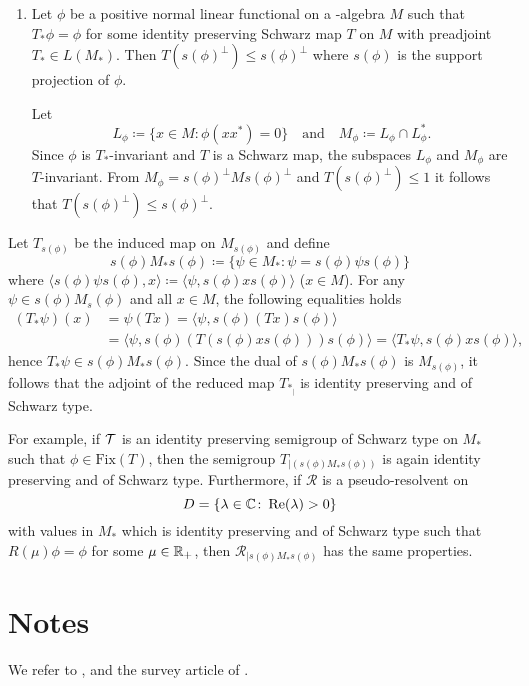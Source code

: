 \begin{enumerate}[1., wide, labelsep=1em]
\item
Let $ \phi $ be a positive normal linear functional on a \WA-algebra $ M $ such that $ T_{*}\phi = \phi $ for some identity preserving Schwarz map $ T $ on $ M $ with preadjoint $ T_{*} \in L(M_{*}) $.
Then $ T(s(\phi)^{\perp}) \leq s(\phi)^{\perp} $ where $ s(\phi) $ is the support projection of $ \phi $.

Let 
%
\[
	L_\phi \coloneqq \{ x \in M \colon \phi(xx^{*}) = 0 \}
	\quad \text{and} \quad
	M_\phi \coloneqq L_\phi \cap L_\phi^{*} .
\]
%
Since $ \phi $ is $ T_{*} $-invariant and $ T $ is a Schwarz map, the subspaces $ L_{\phi} $ and $ M_{\phi} $ are $ T $-invariant.
From $ M_{\phi} = s(\phi)^{\perp}Ms(\phi)^{\perp} $ and $ T(s(\phi)^{\perp}) \leq 1 $ it follows that $ T(s(\phi)^{\perp}) \leq s(\phi)^{\perp} $.

\end{enumerate}
Let $ T_{s(\phi)} $ be the induced map on $ M_{s(\phi)} $ and define
\[
	s(\phi)M_{*}s(\phi) \coloneqq \{\psi \in M_{*} \colon \psi = s(\phi)\psi s(\phi)\}
\]
where $ \langle s(\phi)\psi s(\phi),x \rangle \coloneqq \langle \psi,s(\phi)xs(\phi) \rangle $ ($ x \in M $).
For any $\psi \in s(\phi)M_s(\phi)$ and all $x \in M$, the following equalities holds
\begin{align*}
(T_{*}\psi)(x) &= \psi(Tx) = \langle \psi,s(\phi)(Tx)s(\phi) \rangle \\
	&= \langle \psi,s(\phi)(T(s(\phi)xs(\phi)))s(\phi) \rangle = \langle T_{*}\psi,s(\phi)xs(\phi) \rangle,
\end{align*}
hence $ T_{*}\psi \in s(\phi)M_{*}s(\phi) $.
Since the dual of $ s(\phi)M_{*}s(\phi) $ is $ M_{s(\phi)} $, it follows that the adjoint of the reduced map $ T_{*_{|}} $ is identity preserving and of Schwarz type.

For example, if $ \mathcal{T} $ is an identity preserving semigroup of Schwarz type on $ M_{*} $ such that $ \phi \in \text{Fix}(T) $, then the semigroup $ T_{\vert (s(\phi)M_{*}s(\phi))} $ is again identity preserving and of Schwarz type.
Furthermore, if  $ \mathcal{R} $ is a pseudo-resolvent on 
%
\[
	D = \{\lambda \in \mathbb{C} \colon \mathop{}\!\mathrm{Re}(\lambda) > 0\} 
\]
%
with values in $ M_{*} $ which is identity preserving and of Schwarz type such that $ R(\mu)\phi = \phi $ for some $ \mu \in \mathbb{R}_{+} $, then $ \mathcal{R}_{\vert s(\phi)M_{*}s(\phi)} $ has the same properties.

\section*{Notes}
We refer to \citet{brattelirobinson:1979}, \citet{davies:1976} and the survey article of \citet{oseledets:1984}.
